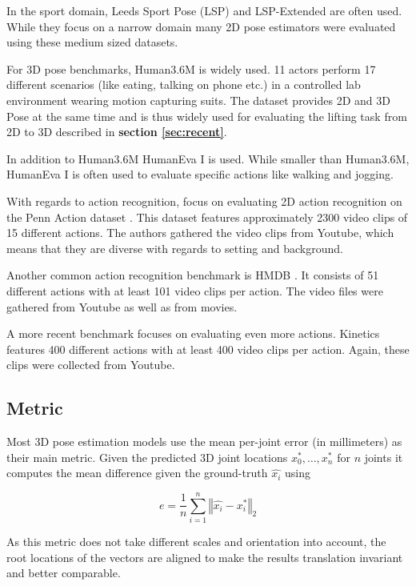 \documentclass[twoside]{article}
\begin{document}
\begin{multicols}{2}
In the sport domain, Leeds Sport Pose (LSP) \cite{johnson_clustered_2010} and LSP-Extended \cite{johnson_learning_2011} are often used.
While they focus on a narrow domain many 2D pose estimators were evaluated using these medium sized datasets.

For 3D pose benchmarks, Human3.6M \cite{ionescu_human3.6m:_2014} is widely used.
11 actors perform 17 different scenarios (like eating, talking on phone etc.) in a controlled lab environment wearing motion capturing suits.
The dataset provides 2D and 3D Pose at the same time and is thus widely used for evaluating the lifting task from 2D to 3D described in \textbf{section \ref{sec:recent}}.

In addition to Human3.6M HumanEva I \cite{sigal_humaneva:_2010} is used.
While smaller than Human3.6M, HumanEva I is often used to evaluate specific actions like walking and jogging.

With regards to action recognition, \cite{luvizon_2d/3d_2018} focus on evaluating 2D action recognition on the Penn Action dataset \cite{zhang_actemes_2013}.
This dataset features approximately 2300 video clips of 15 different actions.
The authors gathered the video clips from Youtube, which means that they are diverse with regards to setting and background.

Another common action recognition benchmark is HMDB \cite{kuehne_hmdb:_2011}.
It consists of 51 different actions with at least 101 video clips per action.
The video files were gathered from Youtube as well as from movies.

A more recent benchmark focuses on evaluating even more actions. Kinetics \cite{kay_kinetics_2017} features 400 different actions with at least 400 video clips per action. Again, these clips were collected from Youtube.


\subsection{Metric}

Most 3D pose estimation models use the mean per-joint error (in millimeters) as their main metric.
Given the predicted 3D joint locations $x_0^{*}, \dots, x_n^{*}$ for $n$ joints it computes the mean difference given the ground-truth $\hat{x_i}$ using

\newcommand\norm[1]{\left\Vert#1\right\Vert}

\[
    e = \frac{1}{n} \sum_{i=1}^{n} \norm{\hat{x_i} - x_i^{*}}_2
\]

As this metric does not take different scales and orientation into account, the root locations of the vectors are aligned to make the results translation invariant and better comparable.


\end{multicols}
\end{document}

